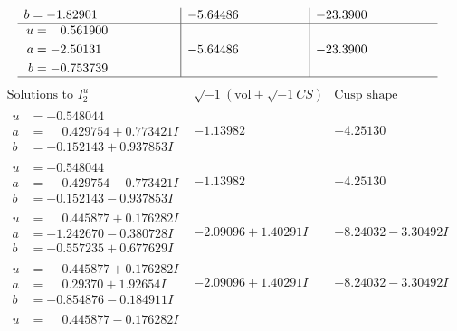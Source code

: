 \documentclass[1p]{elsarticle_modified}
\theoremstyle{definition}
\newcommand{\I}{\sqrt{-1}}
\begin{document}
$$\begin{array}{c|c|c}
\begin{aligned}
b &= -1.82901\phantom{ +0.000000I}\end{aligned}
 & -5.64486\phantom{ +0.000000I} & -23.3900\phantom{ +0.000000I} \\ \hline\begin{aligned}
u &= \phantom{-}0.561900\phantom{ +0.000000I} \\
a &= -2.50131\phantom{ +0.000000I} \\
b &= -0.753739\phantom{ +0.000000I}\end{aligned}
 & -5.64486\phantom{ +0.000000I} & -23.3900\phantom{ +0.000000I}\\
 \hline 
 \end{array}$$\newpage$$\begin{array}{c|c|c}  
\text{Solutions to }I^u_{2}& \I (\text{vol} + \sqrt{-1}CS) & \text{Cusp shape}\\
 \hline 
\begin{aligned}
u &= -0.548044\phantom{ +0.000000I} \\
a &= \phantom{-}0.429754 + 0.773421 I \\
b &= -0.152143 + 0.937853 I\end{aligned}
 & -1.13982\phantom{ +0.000000I} & -4.25130\phantom{ +0.000000I} \\ \hline\begin{aligned}
u &= -0.548044\phantom{ +0.000000I} \\
a &= \phantom{-}0.429754 - 0.773421 I \\
b &= -0.152143 - 0.937853 I\end{aligned}
 & -1.13982\phantom{ +0.000000I} & -4.25130\phantom{ +0.000000I} \\ \hline\begin{aligned}
u &= \phantom{-}0.445877 + 0.176282 I \\
a &= -1.242670 - 0.380728 I \\
b &= -0.557235 + 0.677629 I\end{aligned}
 & -2.09096 + 1.40291 I & -8.24032 - 3.30492 I \\ \hline\begin{aligned}
u &= \phantom{-}0.445877 + 0.176282 I \\
a &= \phantom{-}0.29370 + 1.92654 I \\
b &= -0.854876 - 0.184911 I\end{aligned}
 & -2.09096 + 1.40291 I & -8.24032 - 3.30492 I \\ \hline\begin{aligned}
u &= \phantom{-}0.445877 - 0.176282 I \\

\end{aligned}
\end{array}$$
\end{document}
